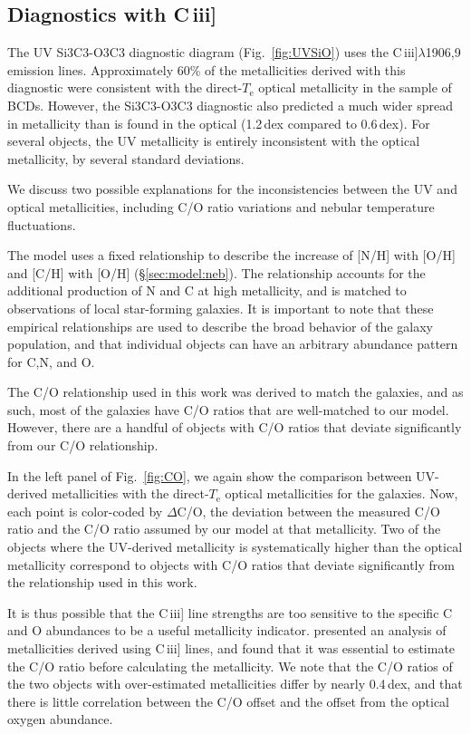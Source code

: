 \documentclass[preprint2]{aastex62}
\newcommand{\ciii}{C\,{\sc iii}]\xspace}
\newcommand{\Te}{\ensuremath{T_{\mathrm{e}}}\xspace}
\begin{document}
\subsection{Diagnostics with \ciii}

The UV Si3C3-O3C3 diagnostic diagram (Fig.~\ref{fig:UVSiO}) uses the \ciii$\lambda$1906,9 emission lines. Approximately 60\% of the metallicities derived with this diagnostic were consistent with the direct-\Te optical metallicity in the \citet{Berg+2016} sample of BCDs. However, the Si3C3-O3C3 diagnostic also predicted a much wider spread in metallicity than is found in the optical (1.2\,dex compared to 0.6\,dex). For several objects, the UV metallicity is entirely inconsistent with the optical metallicity, by several standard deviations.

We discuss two possible explanations for the inconsistencies between the UV and optical metallicities, including C/O ratio variations and nebular temperature fluctuations.

The \citet{Byler+2018} model uses a fixed relationship to describe the increase of [N/H] with [O/H] and [C/H] with [O/H] (\S\ref{sec:model:neb}). The relationship accounts for the additional production of N and C at high metallicity, and is matched to observations of local star-forming galaxies. It is important to note that these empirical relationships are used to describe the broad behavior of the galaxy population, and that individual objects can have an arbitrary abundance pattern for C,N, and O.

The C/O relationship used in this work was derived to match the \citet{Berg+2016} galaxies, and as such, most of the \citet{Berg+2016} galaxies have C/O ratios that are well-matched to our model. However, there are a handful of objects with C/O ratios that deviate significantly from our C/O relationship.

In the left panel of Fig.~\ref{fig:CO}, we again show the comparison between UV-derived metallicities with the direct-\Te optical metallicities for the \citet{Berg+2016} galaxies. Now, each point is color-coded by $\Delta$C/O, the deviation between the measured C/O ratio and the C/O ratio assumed by our model at that metallicity. Two of the objects where the UV-derived metallicity is systematically higher than the optical metallicity correspond to objects with C/O ratios that deviate significantly from the relationship used in this work.

It is thus possible that the \ciii line strengths are too sensitive to the specific C and O abundances to be a useful metallicity indicator. \citet{PerezMontero+2017} presented an analysis of metallicities derived using \ciii lines, and found that it was essential to estimate the C/O ratio before calculating the metallicity. We note that the C/O ratios of the two objects with over-estimated metallicities differ by nearly 0.4\,dex, and that there is little correlation between the C/O offset and the offset from the optical oxygen abundance.
\end{document}
